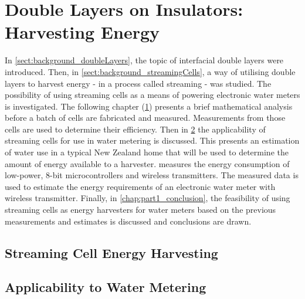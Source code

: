 
\part{Double Layers on Insulators: Harvesting Energy}
   \label{part:doubleLayersOnInsulators}

   In \cref{sect:background_doubleLayers}, the topic of interfacial double layers were introduced.
   Then, in \cref{sect:background_streamingCells}, a way of utilising double layers to harvest energy - in a process called streaming - was studied.
   The possibility of using streaming cells as a means of powering electronic water meters is investigated.
   The following chapter (\cref{chap:part1_streamingCellHarvesters}) presents a brief mathematical analysis before a batch of cells are fabricated and measured.
   Measurements from those cells are used to determine their efficiency.
   Then in \cref{chap:part1_waterMetering} the applicability of streaming cells for use in water metering is discussed.
   This presents an estimation of water use in a typical New Zealand home that will be used to determine the amount of energy available to a harvester.
    measures the energy consumption of low-power, 8-bit microcontrollers and wireless transmitters.
   The measured data is used to estimate the energy requirements of an electronic water meter with wireless transmitter.
   Finally, in \cref{chap:part1_conclusion}, the feasibility of using streaming cells as energy harvesters for water meters based on the previous measurements and estimates is discussed and conclusions are drawn.

   \chapter{Streaming Cell Energy Harvesting}
     \label{chap:part1_streamingCellHarvesters}
     


   \chapter{Applicability to Water Metering}
     \label{chap:part1_waterMetering}
     


